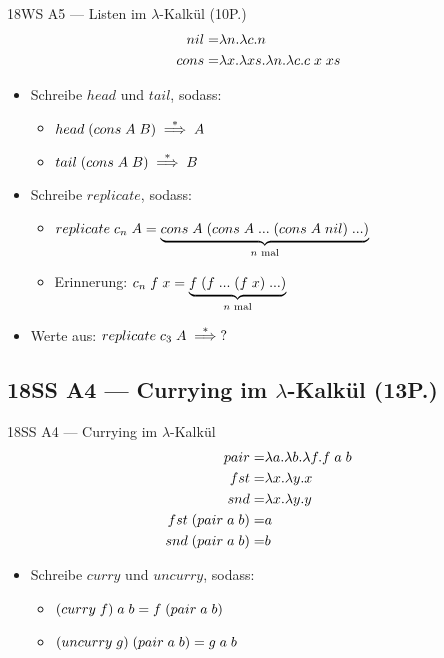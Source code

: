 \documentclass{beamer}
\begin{document}
\begin{frame}{18WS A5 --- Listen im $\lambda$-Kalkül (10P.)}
	\begin{eqnarray*}
		nil  =& \lambda{}n.\lambda{}c.n \\
		cons =& \lambda{}x.\lambda{}xs.\lambda{}n.\lambda{}c.c\;{}x\;{}xs
	\end{eqnarray*}

	\begin{itemize}
		\item Schreibe $head$ und $tail$, sodass:
		\begin{itemize}
			\item $head\;{}(cons\;{}A\;{}B) \stackrel{*}{\implies} A$
			\item $tail\;{}(cons\;{}A\;{}B) \stackrel{*}{\implies} B$
		\end{itemize}
		\pause
		\item Schreibe $replicate$, sodass:
		\begin{itemize}
			\item $replicate\;{}c_n\;{}A = \underbrace{cons\;{}A\;{}(cons\;{}A\;{}...\;{}(cons\;{}A\;{}nil)\;{}...)}_\text{$n$ mal}$
			\item Erinnerung: $c_n\;{}f\;{}x = \underbrace{f\;{}(f\;{}...\;{}(f\;{}x)\;{}...)}_\text{$n$ mal}$
		\end{itemize}
		\pause
		\item Werte aus: $replicate\;{}c_3\;{}A \stackrel{*}{\implies} ?$
	\end{itemize}
\end{frame}

\subsection{18SS A4 --- Currying im $\lambda$-Kalkül (13P.)}

\begin{frame}{18SS A4 --- Currying im $\lambda$-Kalkül}
	\begin{eqnarray*}
		pair =& \lambda{}a.\lambda{}b.\lambda{}f.f\;{}a\;{}b \\
		fst  =& \lambda{}x.\lambda{}y.x \\
		snd  =& \lambda{}x.\lambda{}y.y \\
		fst\;{}(pair\;{}a\;{}b) =& a \\
		snd\;{}(pair\;{}a\;{}b) =& b \\
	\end{eqnarray*}

	\begin{itemize}
		\item Schreibe $curry$ und $uncurry$, sodass:
		\begin{itemize}
			\item $\liiin{\lii{curry}{f}}{a}{b} = \liiin{f}{\liii{pair}{a}{b}}$
			\item $(uncurry\;{}g)\;{}(pair\;{}a\;{}b) = g\;{}a\;{}b$
		\end{itemize}
	\end{itemize}
\end{frame}
\end{document}
